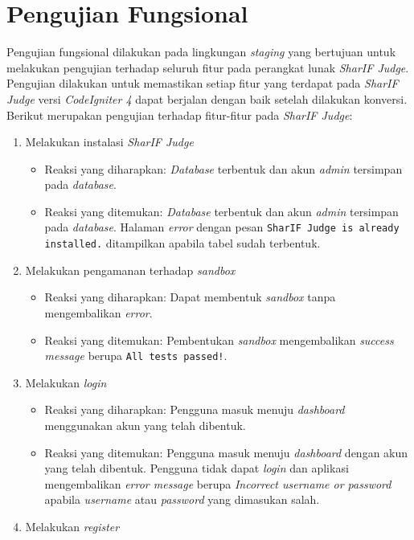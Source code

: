 \section{Pengujian Fungsional}
Pengujian fungsional dilakukan pada lingkungan \textit{staging} yang bertujuan untuk melakukan pengujian terhadap seluruh fitur pada perangkat lunak \textit{SharIF Judge}. Pengujian dilakukan untuk memastikan setiap fitur yang terdapat pada \textit{SharIF Judge} versi \textit{CodeIgniter 4} dapat berjalan dengan baik setelah dilakukan konversi. Berikut merupakan pengujian terhadap fitur-fitur pada \textit{SharIF Judge}:
\begin{enumerate}
	\item Melakukan instalasi \textit{SharIF Judge}
		\begin{itemize}
			\item Reaksi yang diharapkan: \textit{Database} terbentuk dan akun \textit{admin} tersimpan pada \textit{database}. 
			\item Reaksi yang ditemukan: \textit{Database} terbentuk dan akun \textit{admin} tersimpan pada \textit{database}. Halaman \textit{error} dengan pesan \texttt{SharIF Judge is already installed.} ditampilkan apabila tabel sudah terbentuk.
		\end{itemize}
	\item Melakukan pengamanan terhadap \textit{sandbox}
	\begin{itemize}
		\item Reaksi yang diharapkan: Dapat membentuk \textit{sandbox} tanpa mengembalikan \textit{error}.
		\item Reaksi yang ditemukan: Pembentukan \textit{sandbox} mengembalikan \textit{success message} berupa \texttt{All tests passed!}.
	\end{itemize}
	\item Melakukan \textit{login}
		\begin{itemize}
			\item Reaksi yang diharapkan: Pengguna masuk menuju \textit{dashboard} menggunakan akun yang telah dibentuk.
			\item Reaksi yang ditemukan: Pengguna masuk menuju \textit{dashboard} dengan akun yang telah dibentuk. Pengguna tidak dapat \textit{login} dan aplikasi mengembalikan \textit{error message} berupa \textit{Incorrect username or password} apabila \textit{username} atau \textit{password} yang dimasukan salah.
		\end{itemize}
	\item Melakukan \textit{register}

\end{enumerate}
